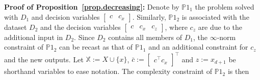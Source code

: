 \begin{my_proof}
	\textbf{Proof of Proposition~\ref{prop.decreasing}:}
	Denote by $\mathds{P}1_1$ the problem solved with $D_1$ and decision variables $\begin{bmatrix} c & c_x \end{bmatrix}$. Similarly, $\mathds{P}1_2$ is associated with the dataset $D_2$ and the decision variables $\begin{bmatrix} c & c_x & c_z \end{bmatrix}$, where $c_z$ are due to the additional input in $D_2$. Since $D_2$ contains all members of $D_1$, the $\infty$-norm constraint of $\mathds{P}1_2$ can be recast as that of $\mathds{P}1_1$ and an additional constraint for $c_z$ and the new outputs. Let $\mathds{X}  := X \cup \{x\}$, $\bar c := \begin{bmatrix} c^\top c_x \end{bmatrix}^\top$ and $z := x_{d+1}$ be shorthand variables to ease notation. The complexity constraint of $\mathds{P}1_2$ is then
	

\end{my_proof}
